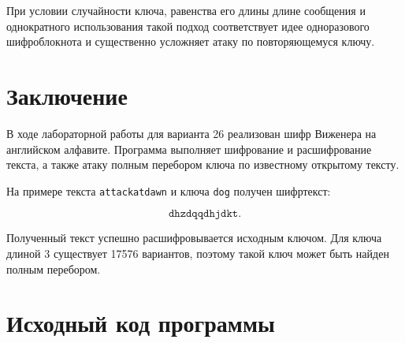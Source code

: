 \documentclass[a4paper,14pt,oneside]{extarticle}
\begin{document}
При условии случайности ключа, равенства его длины длине сообщения и
однократного использования такой подход соответствует идее одноразового
шифроблокнота и существенно усложняет атаку по повторяющемуся ключу.

\section{Заключение}

В ходе лабораторной работы для варианта 26 реализован шифр Виженера на
английском алфавите. Программа выполняет шифрование и расшифрование текста,
а также атаку полным перебором ключа по известному открытому тексту.

На примере текста \texttt{attackatdawn} и ключа \texttt{dog} получен
шифртекст:

\[
\texttt{dhzdqqdhjdkt}.
\]

Полученный текст успешно расшифровывается исходным ключом. Для ключа длиной 3
существует 17576 вариантов, поэтому такой ключ может быть найден полным
перебором.

\appendix
\section{Исходный код программы}

\end{document}
